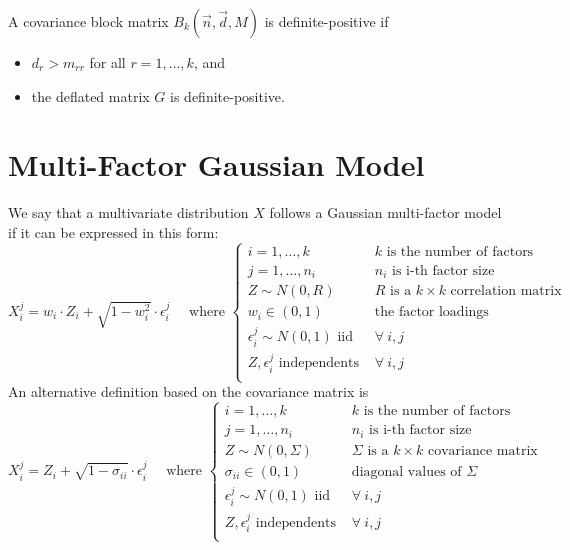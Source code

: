 \documentclass[11pt,fleqn]{book} %
\begin{document}
\begin{corollary}
	A covariance block matrix $B_k(\vec{n},\vec{d},M)$ is definite-positive if
	\begin{itemize}
		\item $d_r > m_{rr}$ for all $r=1,\dots,k$, and
		\item the deflated matrix $G$ is definite-positive.
	\end{itemize}
\end{corollary}

\section{Multi-Factor Gaussian Model}
\label{ap:mfgm}

\begin{definition}
	\label{def:gmfm}
	We say that a multivariate distribution $X$ follows a Gaussian multi-factor
	model if it can be expressed in this form:
	\begin{displaymath}
		X_i^j = w_i \cdot Z_i + \sqrt{1-w_i^2} \cdot \epsilon_i^j
		\quad \text{ where } \left\{
		\begin{array}{ll}
			i = 1, \dots, k & \text{$k$ is the number of factors}    \\
			j = 1, \dots, n_i & \text{$n_i$ is i-th factor size}     \\
			Z \sim N(0,R) & \text{$R$ is a $k {\times} k$ correlation matrix} \\
			w_i \in (0,1) & \text{the factor loadings }                  \\
			\epsilon_i^j \sim N(0,1) \text { iid } & \forall\ i,j               \\
			Z, \epsilon_i^j \text{ independents } & \forall\ i,j                \\
		\end{array}
		\right.
	\end{displaymath}
	An alternative definition based on the covariance matrix is
	\begin{displaymath}
		X_i^j = Z_i + \sqrt{1-\sigma_{ii}} \cdot \epsilon_i^j
		\quad \text{ where } \left\{
		\begin{array}{ll}
			i = 1, \dots, k   & \text{$k$ is the number of factors} \\
			j = 1, \dots, n_i & \text{$n_i$ is i-th factor size} \\
			Z \sim N(0,\Sigma)     & \text{$\Sigma$ is a $k {\times} k$ covariance matrix} \\
			\sigma_{ii} \in (0,1)  & \text{diagonal values of $\Sigma$} \\
			\epsilon_i^j \sim N(0,1) \text { iid } & \forall\ i,j \\
			Z, \epsilon_i^j \text{ independents }  & \forall\ i,j \\
		\end{array}
		\right.
	\end{displaymath}
\end{definition}
\end{document}
